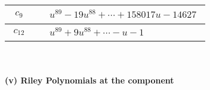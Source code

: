 \documentclass[1p]{elsarticle_modified}
\theoremstyle{definition}
\begin{document}
\begin{tabular}{m{50pt}|m{274pt}}
\hline $$\begin{aligned}c_{9}\end{aligned}$$&$\begin{aligned}
&u^{89}-19 u^{88}+\cdots+158017 u-14627
\end{aligned}$\\
\hline $$\begin{aligned}c_{12}\end{aligned}$$&$\begin{aligned}
&u^{89}+9 u^{88}+\cdots- u-1
\end{aligned}$\\
\hline
\end{tabular}\\~\\
\newpage\renewcommand{\arraystretch}{1}
\flushleft \textbf{(v) Riley Polynomials at the component}\newline \\
\end{document}
